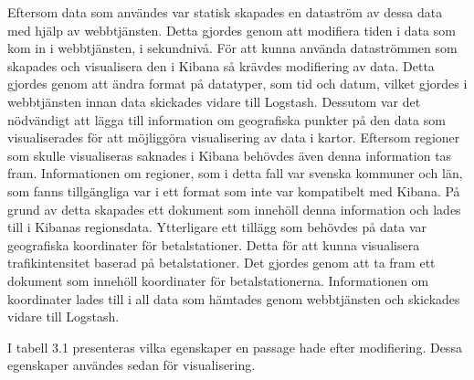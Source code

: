 \documentclass[12pt]{kththesis}
\begin{document}
Eftersom data som användes var statisk skapades en dataström av dessa data med hjälp av webbtjänsten. Detta gjordes genom att modifiera tiden i data som kom in i webbtjänsten, i sekundnivå. För att kunna använda dataströmmen som skapades och visualisera den i Kibana så krävdes modifiering av data. Detta gjordes genom att ändra format på datatyper, som tid och datum, vilket gjordes i webbtjänsten innan data skickades vidare till Logstash. Dessutom var det nödvändigt att lägga till information om geografiska punkter på den data som visualiserades för att möjliggöra visualisering av data i kartor. Eftersom regioner som skulle visualiseras saknades i Kibana behövdes även denna information tas fram. Informationen om regioner, som i detta fall var svenska kommuner och län, som fanns tillgängliga var i ett format som inte var kompatibelt med Kibana. På grund av detta skapades ett dokument som innehöll denna information och lades till i Kibanas regionsdata. Ytterligare ett tillägg som behövdes på data var geografiska koordinater för betalstationer. Detta för att kunna visualisera trafikintensitet baserad på betalstationer. Det gjordes genom att ta fram ett dokument som innehöll koordinater för betalstationerna. Informationen om koordinater lades till i all data som hämtades genom webbtjänsten och skickades vidare till Logstash. 

I tabell 3.1 presenteras vilka egenskaper en passage hade efter modifiering. Dessa egenskaper användes sedan för visualisering. 
\newpage
\captionsetup[table]{name=Tabell}
\end{document}
